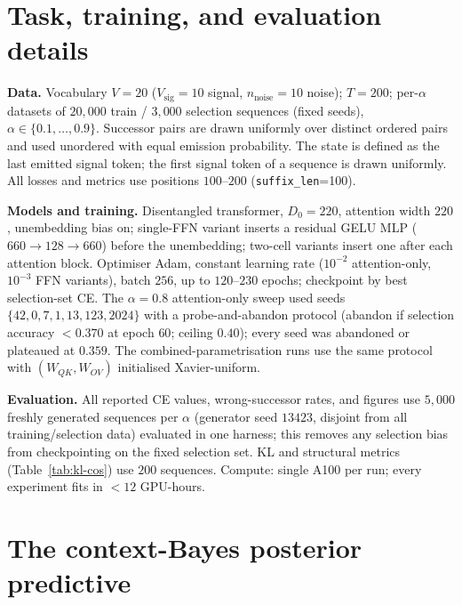\documentclass{article} %
\newcommand{\Vsig}{V_{\mathrm{sig}}}
\newcommand{\nnoise}{n_{\mathrm{noise}}}
\newcommand{\WQK}{W_{QK}}
\newcommand{\WOV}{W_{OV}}
\begin{document}
\section{Task, training, and evaluation details}
\label{app:setup}

\textbf{Data.} Vocabulary $V=20$ ($\Vsig=10$ signal, $\nnoise=10$ noise);
$T=200$; per-$\alpha$ datasets of $20{,}000$ train / $3{,}000$ selection sequences
(fixed seeds), $\alpha\in\{0.1,\dots,0.9\}$. Successor pairs are drawn uniformly over
distinct ordered pairs and used unordered with equal emission probability. The state
is defined as the last emitted signal token; the first signal token of a sequence is
drawn uniformly. All losses and metrics use positions $100$--$200$
(\texttt{suffix\_len}=100).

\textbf{Models and training.} Disentangled transformer, $D_0=220$, attention width
$220$, unembedding bias on; single-FFN variant inserts a residual GELU MLP
($660\to128\to660$) before the unembedding; two-cell variants insert one after each
attention block. Optimiser Adam, constant learning rate ($10^{-2}$ attention-only,
$10^{-3}$ FFN variants), batch $256$, up to $120$--$230$ epochs; checkpoint by best
selection-set CE. The $\alpha=0.8$ attention-only sweep used seeds
$\{42,0,7,1,13,123,2024\}$ with a probe-and-abandon protocol (abandon if selection
accuracy $<0.370$ at epoch $60$; ceiling $0.40$); every seed was abandoned or
plateaued at $0.359$. The combined-parametrisation runs use the same protocol with
$(\WQK,\WOV)$ initialised Xavier-uniform.

\textbf{Evaluation.} All reported CE values, wrong-successor rates, and figures use
$5{,}000$ freshly generated sequences per $\alpha$ (generator seed $13423$, disjoint
from all training/selection data) evaluated in one harness; this removes any
selection bias from checkpointing on the fixed selection set. KL and structural
metrics (Table~\ref{tab:kl-cos}) use $200$ sequences. Compute: single A100 per run;
every experiment fits in ${<}12$ GPU-hours.

\section{The context-Bayes posterior predictive}
\label{app:bayes}
\end{document}
